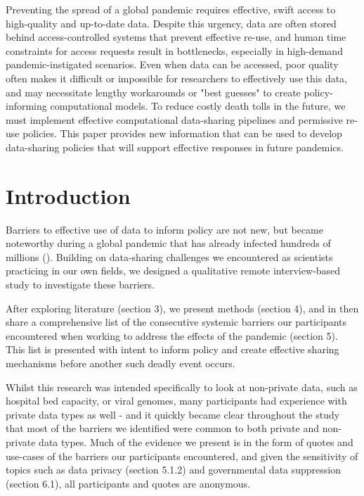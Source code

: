 \documentclass{CUP-JNL-DAP}%
\begin{document}
\begin{Frontmatter}
\begin{policy}
Preventing the spread of a global pandemic requires effective, swift access to high-quality and up-to-date data. Despite this urgency,  data are often stored behind access-controlled systems that prevent effective re-use, and human time constraints for access requests result in bottlenecks, especially in high-demand pandemic-instigated scenarios. Even when data can be accessed, poor quality often makes it difficult or impossible for researchers to effectively use this data, and may necessitate lengthy workarounds or "best guesses" to create policy-informing computational models. To reduce costly death tolls in the future, we must implement effective computational data-sharing pipelines and permissive re-use policies. This paper provides new information that can be used to develop data-sharing policies that will support effective responses in future pandemics.
\end{policy}
\end{Frontmatter}


\section{Introduction}
Barriers to effective use of data to inform policy are not new, but became noteworthy during a global pandemic that has already infected hundreds of millions (\cite{owidcoronavirus}). Building on data-sharing challenges we encountered as scientists practicing in our own fields, we designed a qualitative remote interview-based study to investigate these barriers. 

After exploring literature (section 3), we present methods (section 4), and in then share a comprehensive list of the consecutive systemic barriers our participants encountered when working to address the effects of the pandemic (section 5). This list is presented with intent to inform policy and create effective sharing mechanisms before another such deadly event occurs. 

Whilst this research was intended specifically to look at non-private data, such as hospital bed capacity, or viral genomes,  many participants had experience with private data types as well - and it quickly became clear throughout the study that most of the barriers we identified were common to both private and non-private data types.  Much of the evidence we present is in the form of quotes and use-cases of the barriers our participants encountered, and given the sensitivity of topics such as data privacy (section 5.1.2) and governmental data suppression (section 6.1), all participants and quotes are anonymous. 
\end{document}
